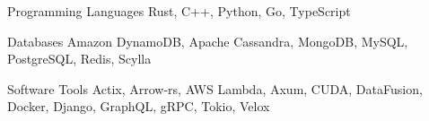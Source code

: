 

\begin{cvskills}

  \cvskill
    {Programming Languages} %
    {Rust, C++, Python, Go, TypeScript} %

  \cvskill
    {Databases} %
    {Amazon DynamoDB, Apache Cassandra, MongoDB, MySQL, PostgreSQL, Redis, Scylla} %

  \cvskill
    {Software Tools} %
    {Actix, Arrow-rs, AWS Lambda, Axum, CUDA, DataFusion, Docker, Django, GraphQL, gRPC, Tokio, Velox} %

\end{cvskills}
